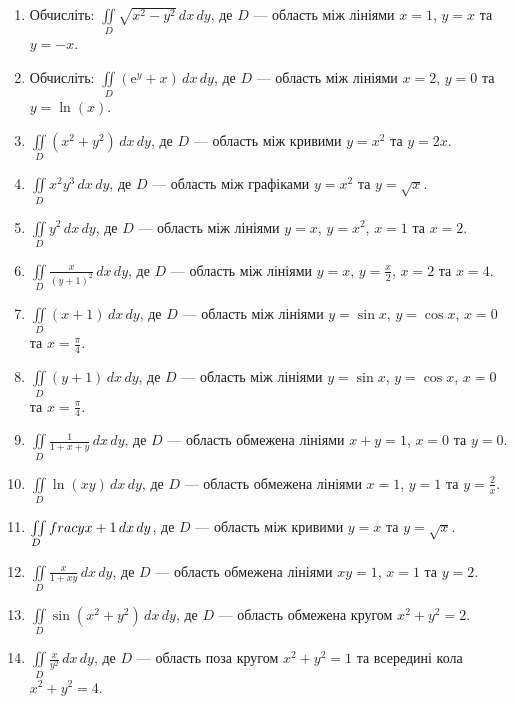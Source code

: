 \begin{enumerate}
\begin{enumerate}[label*=\arabic*.]
  \item Обчисліть: $\iint\limits_D \sqrt{x^{2}-y^{2}}\,dx\,dy$, де $D$ --- область між лініями ${x = 1}$, ${y = x}$ та ${y = -x}$.
  \item Обчисліть: $\iint\limits_D \left({\mathrm e}^{y}+x\right)\,dx\,dy$, де $D$ --- область між лініями ${x = 2}$, ${y = 0}$ та ${y = \ln(x)}$.
  \item ${ \iint\limits_D \left(x^2 + y^2\right) \,dx \,dy }$, де ${ D }$ --- область між кривими ${ y = x^2 }$ та ${ y = 2x }$.
  \item ${ \iint\limits_D x^2y^3 \,dx \,dy }$, де ${ D }$ --- область між графіками ${ y = x^2 }$ та ${ y = \sqrt{x} }$.
  \item ${ \iint\limits_D y^2 \,dx \,dy }$, де ${ D }$ --- область між лініями ${ y = x }$, ${ y = x^2 }$, ${x = 1}$ та ${ x = 2 }$.
  \item ${ \iint\limits_D \frac{x}{\left(y+1\right)^{2}} \,dx \,dy }$, де ${ D }$ --- область між лініями ${ y = x }$, ${ y = \frac{x}{2} }$, ${x = 2}$ та ${ x = 4 }$.
  \item ${ \iint\limits_D (x + 1) \,dx \,dy }$, де ${ D }$ --- область між лініями ${ y = \sin x }$, ${ y = \cos x }$, ${x = 0}$ та ${ x = \frac{\pi}{4} }$.
  \item ${ \iint\limits_D (y + 1) \,dx \,dy }$, де ${ D }$ --- область між лініями ${ y = \sin x }$, ${ y = \cos x }$, ${x = 0}$ та ${ x = \frac{\pi}{4} }$.
  \item ${ \iint\limits_D \frac{1}{1+x+y} \,dx \,dy }$, де ${ D }$ --- область обмежена лініями ${ x + y = 1 }$, ${ x = 0 }$ та ${ y = 0 }$.
  \item ${ \iint\limits_D \ln(xy) \,dx \,dy }$, де ${ D }$ --- область обмежена лініями ${ x = 1 }$, ${ y = 1 }$ та ${ y = \frac{2}{x} }$.
  \item ${ \iint\limits_D \\frac{y}{x+1} \,dx \,dy }$, де ${ D }$ --- область між кривими ${ y = x }$ та ${ y = \sqrt{x} }$.

\item ${ \iint\limits_D \frac{x}{1+xy} \,dx \,dy }$, де ${ D }$ --- область обмежена лініями ${ xy = 1 }$, ${ x = 1 }$ та ${ y = 2 }$.

\item ${ \iint\limits_D \sin(x^2+y^2) \,dx \,dy }$, де ${ D }$ --- область обмежена кругом ${ x^2 + y^2 = 2 }$.

\item ${ \iint\limits_D \frac{x}{y^2} \,dx \,dy }$, де ${ D }$ --- область поза кругом ${ x^2 + y^2 = 1 }$ та всередині кола ${ x^2 + y^2 = 4 }$.


\end{enumerate}
\end{enumerate}
